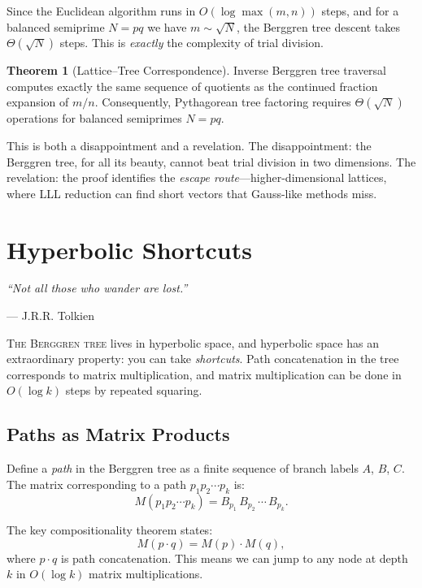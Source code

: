 \documentclass[11pt,twoside,openright]{book}
\theoremstyle{definition}
\newtheorem{theorem}{Theorem}[chapter]
\begin{document}
Since the Euclidean algorithm runs in $O(\log \max(m,n))$ steps, and
for a balanced semiprime $N = pq$ we have $m \sim \sqrt{N}$, the
Berggren tree descent takes $\Theta(\sqrt{N})$ steps. This is
\emph{exactly} the complexity of trial division.

\begin{theorem}[Lattice--Tree Correspondence]
Inverse Berggren tree traversal computes exactly the same sequence
of quotients as the continued fraction expansion of $m/n$.
Consequently, Pythagorean tree factoring requires $\Theta(\sqrt{N})$
operations for balanced semiprimes $N = pq$.
\end{theorem}

This is both a disappointment and a revelation. The disappointment:
the Berggren tree, for all its beauty, cannot beat trial division in
two dimensions. The revelation: the proof identifies the \emph{escape
route}---higher-dimensional lattices, where LLL reduction can find
short vectors that Gauss-like methods miss.

\chapter{Hyperbolic Shortcuts}
\label{ch:hyperbolic}

\epigraph{\itshape ``Not all those who wander are lost.''}
{--- J.R.R. Tolkien}

\lettrine[lines=3]{T}{he Berggren tree} lives in hyperbolic space, and
hyperbolic space has an extraordinary property: you can take
\emph{shortcuts}. Path concatenation in the tree corresponds to matrix
multiplication, and matrix multiplication can be done in $O(\log k)$
steps by repeated squaring.

\section{Paths as Matrix Products}

Define a \emph{path} in the Berggren tree as a finite sequence of
branch labels $A$, $B$, $C$. The matrix corresponding to a path
$p_1 p_2 \cdots p_k$ is:
\[
M(p_1 p_2 \cdots p_k) = B_{p_1}\, B_{p_2}\, \cdots\, B_{p_k}.
\]

The key compositionality theorem states:
\[
M(p \cdot q) = M(p) \cdot M(q),
\]
where $p \cdot q$ is path concatenation. This means we can jump to any
node at depth $k$ in $O(\log k)$ matrix multiplications.
\end{document}
